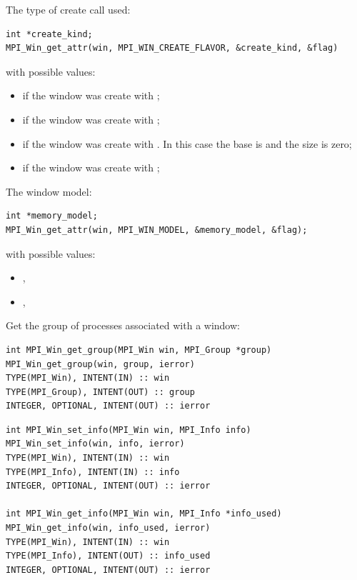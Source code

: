 The type of create call used:
\begin{lstlisting}
int *create_kind;
MPI_Win_get_attr(win, MPI_WIN_CREATE_FLAVOR, &create_kind, &flag)
\end{lstlisting}
with possible values:
\begin{itemize}
\item {} if the window was create
  with ;
\item {} if the window was create
  with ;
\item {} if the window was create
  with . In this case the base is
   and the size is zero;
\item {} if the window was create
  with ;
\end{itemize}

The window model:
\begin{lstlisting}
int *memory_model;
MPI_Win_get_attr(win, MPI_WIN_MODEL, &memory_model, &flag);
\end{lstlisting}
with possible values:
\begin{itemize}
\item {},
\item {},
\end{itemize}

Get the group of processes associated with a window:
\begin{verbatim}
int MPI_Win_get_group(MPI_Win win, MPI_Group *group) 
MPI_Win_get_group(win, group, ierror) 
TYPE(MPI_Win), INTENT(IN) :: win 
TYPE(MPI_Group), INTENT(OUT) :: group 
INTEGER, OPTIONAL, INTENT(OUT) :: ierror
\end{verbatim}

\begin{verbatim}
int MPI_Win_set_info(MPI_Win win, MPI_Info info)
MPI_Win_set_info(win, info, ierror)
TYPE(MPI_Win), INTENT(IN) :: win
TYPE(MPI_Info), INTENT(IN) :: info
INTEGER, OPTIONAL, INTENT(OUT) :: ierror

int MPI_Win_get_info(MPI_Win win, MPI_Info *info_used)
MPI_Win_get_info(win, info_used, ierror)
TYPE(MPI_Win), INTENT(IN) :: win
TYPE(MPI_Info), INTENT(OUT) :: info_used
INTEGER, OPTIONAL, INTENT(OUT) :: ierror
\end{verbatim}

